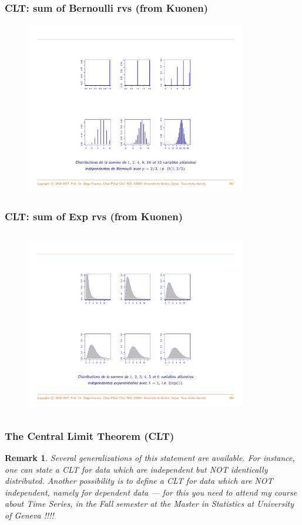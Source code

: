 \documentclass[notes=show,smaller,handout]{beamer}
\newtheorem{remark}{Remark}[section]
\begin{document}
\begin{frame}%
\frametitle{CLT: sum of Bernoulli rvs (from Kuonen)}
\begin{figure}[ptb]\centering
\includegraphics[height=3in, width=3.8in]{Bernoulli.pdf}%
\end{figure}%
\end{frame}%


\begin{frame}%
\frametitle{CLT: sum of Exp rvs (from Kuonen)}

\begin{figure}[ptb]\centering
\includegraphics[height=3.2in, width=3.8in]{Exp.pdf}%
\end{figure}%
\end{frame}%


\begin{frame}%

\frametitle{The Central Limit Theorem (CLT)}

\begin{remark}
Several generalizations of this statement are available. For instance, one can state a CLT for data which are independent but NOT identically distributed. Another possibility is to define a CLT for data which are NOT independent, namely for dependent data --- for this you need to attend my course about Time Series, in the Fall semester at the Master in Statistics at University of Geneva !!!!
\end{remark}

\end{frame}%
\end{document}
